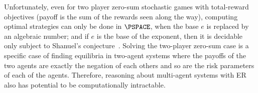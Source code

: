 Unfortunately, even for two player zero-sum stochastic games with total-reward objectives (payoff is the sum of the rewards seen along the way), computing optimal strategies can only be done in $\PSPACE$, when the base $e$ is replaced by an algebraic number; and if $e$ is the base of the exponent, then it is decidable only subject to Shanuel's conjecture~\cite{BCMP24}. %
Solving the two-player zero-sum case is a specific case of finding equilibria in two-agent systems where the payoffs of the two agents are exactly the negation of each others and so are the risk parameters of each of the agents.
Therefore, reasoning about multi-agent systems with ER also has potential to be computationally intractable.%





